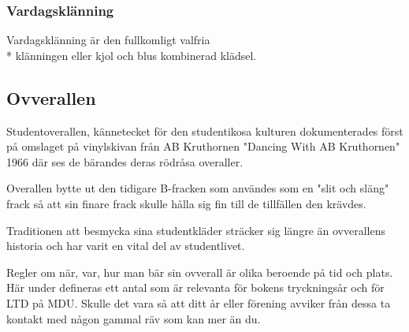 \subsubsection*{\textbf{Vardagsklänning}}
Vardagsklänning är den fullkomligt valfria\\* klänningen eller kjol och blus kombinerad klädsel.

\subsection*{\textbf{Ovverallen}}
Studentoverallen, kännetecket för den studentikosa kulturen dokumenterades först på omslaget på vinylskivan från AB Kruthornen "Dancing With AB Kruthornen" 1966   
där ses de bärandes deras rödråsa overaller. 

Overallen bytte ut den tidigare B-fracken som användes som en "slit och släng" frack så att sin finare frack skulle hålla sig fin till de tillfällen
den krävdes.

Traditionen att besmycka sina studentkläder sträcker sig längre än ovverallens historia och har varit en vital del av studentlivet.

Regler om när, var, hur man bär sin ovverall är olika beroende på tid och plats. Här under defineras ett antal som är relevanta 
för bokens tryckningsår och för LTD på MDU. Skulle det vara så att ditt år eller förening avviker från dessa ta kontakt med 
någon gammal räv som kan mer än du.




